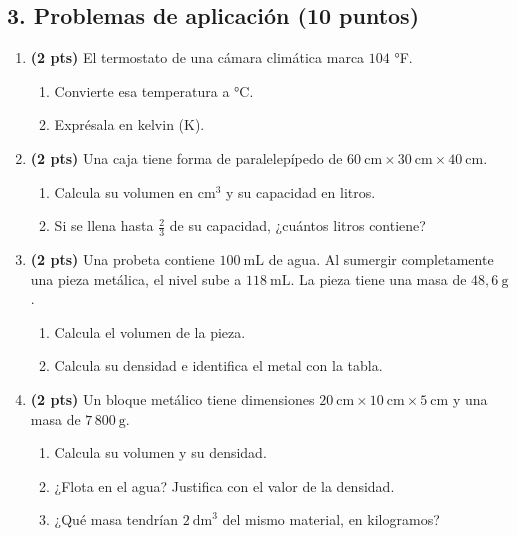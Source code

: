 \documentclass[12pt, letterpaper]{article}
\begin{document}
\newpage
\subsection*{3. Problemas de aplicación (10 puntos)}

\begin{enumerate}[leftmargin=*, label=\textbf{\arabic*.}, itemsep=1.0em]

  \item \textbf{(2 pts)} El termostato de una cámara climática marca $104$ °F.
        \begin{enumerate}[label=\alph*), leftmargin=1.8em, itemsep=0.3em]
          \item Convierte esa temperatura a °C.
          \item Exprésala en kelvin (K).
        \end{enumerate}
        \vspace{1.6cm}

  \item \textbf{(2 pts)} Una caja tiene forma de paralelepípedo de
        $60\ \text{cm}\times30\ \text{cm}\times40\ \text{cm}$.
        \begin{enumerate}[label=\alph*), leftmargin=1.8em, itemsep=0.3em]
          \item Calcula su volumen en $\text{cm}^3$ y su capacidad en litros.
          \item Si se llena hasta $\frac{2}{3}$ de su capacidad, ¿cuántos litros contiene?
        \end{enumerate}
        \vspace{1.8cm}

  \item \textbf{(2 pts)} Una probeta contiene $100\ \text{mL}$ de agua. Al sumergir
        completamente una pieza metálica, el nivel sube a $118\ \text{mL}$.
        La pieza tiene una masa de $48{,}6\ \text{g}$.
        \begin{enumerate}[label=\alph*), leftmargin=1.8em, itemsep=0.3em]
          \item Calcula el volumen de la pieza.
          \item Calcula su densidad e identifica el metal con la tabla.
        \end{enumerate}
        \vspace{1.8cm}

  \item \textbf{(2 pts)} Un bloque metálico tiene dimensiones
        $20\ \text{cm}\times10\ \text{cm}\times5\ \text{cm}$ y una masa de $7\,800\ \text{g}$.
        \begin{enumerate}[label=\alph*), leftmargin=1.8em, itemsep=0.3em]
          \item Calcula su volumen y su densidad.
          \item ¿Flota en el agua? Justifica con el valor de la densidad.
          \item ¿Qué masa tendrían $2\ \text{dm}^3$ del mismo material, en kilogramos?
        \end{enumerate}
        \vspace{1.8cm}


\end{enumerate}
\end{document}
